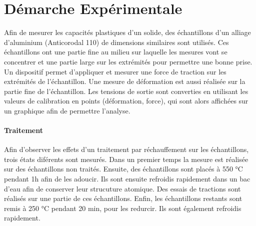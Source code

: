\section{Démarche Expérimentale}

Afin de mesurer les capacités plastiques d'un solide, des échantillons d'un alliage d'aluminium (Anticorodal 110) de dimensions similaires sont utilisés. Ces échantillons ont une partie fine au milieu sur laquelle les mesures vont se concentrer et une partie large sur les extrémités pour permettre une bonne prise. Un dispositif permet d'appliquer et mesurer une force de traction sur les extrémités de l'échantillon. Une mesure de déformation est aussi réalisée sur la partie fine de l'échantillon. Les tensions de sortie sont converties en utilisant les valeurs de calibration en points (déformation, force), qui sont alors affichées sur un graphique afin de permettre l'analyse.

\paragraph{Traitement} Afin d'observer les effets d'un traitement par réchauffement sur les échantillons, trois états diférents sont mesurés. Dans un premier temps la mesure est réalisée sur des échantillons non traités. Ensuite, des échantillons sont placés à 550 \si{\celsius} pendant 1h afin de les adoucir. Ils sont ensuite refroidis rapidement dans un bac d'eau afin de conserver leur strucuture atomique. Des essais de tractions sont réalisés sur une partie de ces échantillons. Enfin, les échantillons restants sont remis à 250 \si{\celsius} pendant 20 min, pour les redurcir. Ils sont également refroidis rapidement.